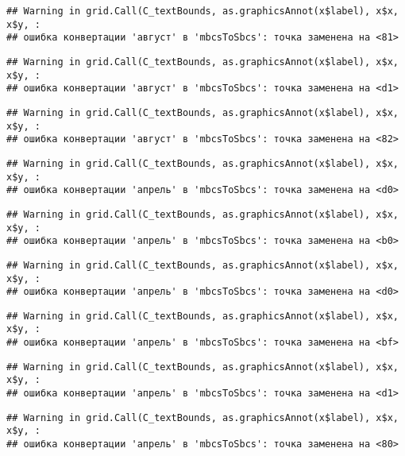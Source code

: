 \documentclass[
]{article}
\begin{document}
\begin{verbatim}
## Warning in grid.Call(C_textBounds, as.graphicsAnnot(x$label), x$x, x$y, :
## ошибка конвертации 'август' в 'mbcsToSbcs': точка заменена на <81>
\end{verbatim}

\begin{verbatim}
## Warning in grid.Call(C_textBounds, as.graphicsAnnot(x$label), x$x, x$y, :
## ошибка конвертации 'август' в 'mbcsToSbcs': точка заменена на <d1>
\end{verbatim}

\begin{verbatim}
## Warning in grid.Call(C_textBounds, as.graphicsAnnot(x$label), x$x, x$y, :
## ошибка конвертации 'август' в 'mbcsToSbcs': точка заменена на <82>
\end{verbatim}

\begin{verbatim}
## Warning in grid.Call(C_textBounds, as.graphicsAnnot(x$label), x$x, x$y, :
## ошибка конвертации 'апрель' в 'mbcsToSbcs': точка заменена на <d0>
\end{verbatim}

\begin{verbatim}
## Warning in grid.Call(C_textBounds, as.graphicsAnnot(x$label), x$x, x$y, :
## ошибка конвертации 'апрель' в 'mbcsToSbcs': точка заменена на <b0>
\end{verbatim}

\begin{verbatim}
## Warning in grid.Call(C_textBounds, as.graphicsAnnot(x$label), x$x, x$y, :
## ошибка конвертации 'апрель' в 'mbcsToSbcs': точка заменена на <d0>
\end{verbatim}

\begin{verbatim}
## Warning in grid.Call(C_textBounds, as.graphicsAnnot(x$label), x$x, x$y, :
## ошибка конвертации 'апрель' в 'mbcsToSbcs': точка заменена на <bf>
\end{verbatim}

\begin{verbatim}
## Warning in grid.Call(C_textBounds, as.graphicsAnnot(x$label), x$x, x$y, :
## ошибка конвертации 'апрель' в 'mbcsToSbcs': точка заменена на <d1>
\end{verbatim}

\begin{verbatim}
## Warning in grid.Call(C_textBounds, as.graphicsAnnot(x$label), x$x, x$y, :
## ошибка конвертации 'апрель' в 'mbcsToSbcs': точка заменена на <80>
\end{verbatim}
\end{document}
